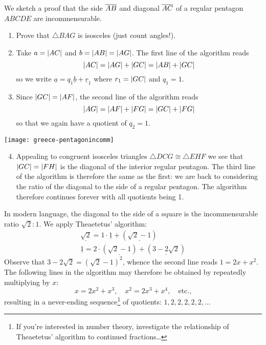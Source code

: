 \goodbreak

\label{ex:theaetetus} We sketch a proof that the side $\overline{AB}$ and diagonal $\overline{AC}$ of a regular pentagon $ABCDE$ are incommensurable.\par
\begin{minipage}[t]{0.65\linewidth}\vspace{-5pt}
	\begin{enumerate}\itemsep0pt
	  \item Prove that $\triangle BAG$ is isosceles (just count angles!).
	  \item Take $a=\left| AC\right|$ and $b=\left| AB\right|=\left| AG\right|$. The first line of the algorithm reads
	  \[
	  	\left| AC\right|=\left| AG\right|+\left| GC\right|=\left| AB\right|+\left| GC\right|
	  \]
	  so we write $\underline a=q_1\underline b+\underline r_1$ where $r_1=\left| GC\right|$ and $q_1=1$.
	  \item Since $\left| GC\right|=\left| AF\right|$, the second line of the algorithm reads
	  \[
	  	\left| AG\right|=\left| AF\right|+\left| FG\right|=\left| GC\right|+\left| FG\right|
	  \]
	  so that we again have a quotient of $q_2=1$.
	\end{enumerate}
\end{minipage}
\hfill
\begin{minipage}[t]{0.34\textwidth}\vspace{-5pt}
	\flushright
	\texttt{[image: greece-pentagonincomm]}
\end{minipage}
	
	
\begin{enumerate}\setcounter{enumi}{3}
	\item Appealing to congruent isosceles triangles $\triangle DCG\cong\triangle EHF$ we see that $\left| GC\right|=\left| FH\right|$ is the diagonal of the interior regular pentagon. The third line of the algorithm is therefore the same as the first: we are back to considering the ratio of the diagonal to the side of a regular pentagon. The algorithm therefore continues forever with all quotients being 1.
\end{enumerate}



In modern language, the diagonal to the side of a square is the incommensurable ratio $\sqrt 2:1$. We apply Theaetetus' algorithm:
\begin{gather*}
	\underline{\sqrt 2}=1\cdot \underline 1+(\underline{\sqrt 2-1})\\
	\underline 1=2\cdot(\underline{\sqrt 2-1})+(\underline{3-2\sqrt 2})
\end{gather*}
Observe that $3-2\sqrt 2=(\sqrt 2-1)^2$, whence the second line reads $1=2x+x^2$. The following lines in the algorithm may therefore be obtained by repeatedly multiplying by $x$:
\[
	x=2x^2+x^3,\quad x^2=2x^3+x^4,\quad\text{etc.,}
\]
resulting in a never-ending sequence\footnote{%
If you're interested in number theory, investigate the relationship of Theaetetus' algorithm to continued fractions\ldots%
} of quotients: $1,2,2,2,2,2,\ldots$
	

